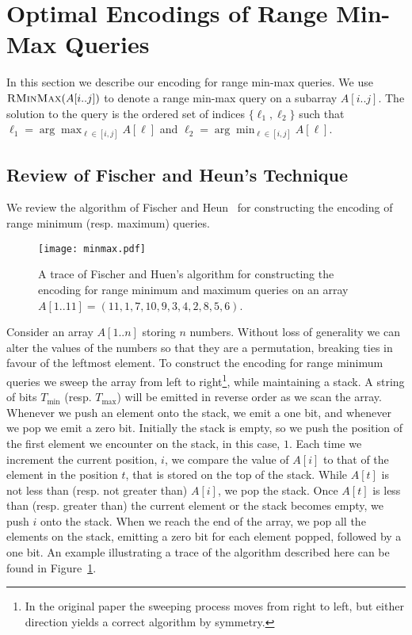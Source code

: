 \documentclass[runningheads]{llncs}
\newcommand{\rminmax}{\textsc{RMinMax}}
\begin{document}
\section{Optimal Encodings of Range Min-Max Queries\label{sec:min-max}}

In this section we describe our encoding for range min-max queries.
We use $\rminmax(A[i..j])$ to denote a range min-max query on a
subarray $A[i..j]$.  The solution to the query is the ordered set of
indices $\{\ell_1, \ell_2\}$ such that $\ell_1 = \arg\max_{\ell \in
  [i,j]}A[\ell]$ and $\ell_2 = \arg\min_{\ell \in [i,j]}A[\ell]$.

\subsection{Review of Fischer and Heun's Technique}

We review the algorithm of Fischer and Heun~\cite{FH11} for
constructing the encoding of range minimum (resp. maximum) queries.


\begin{figure}
\centering
\texttt{[image: minmax.pdf]}
\caption{\label{fig:perm}A trace of Fischer and Huen's algorithm for
  constructing the encoding for range minimum and maximum queries on
  an array $A[1..11]=(11,1,7,10,9,3,4,2,8,5,6)$.}
\end{figure}


Consider an array $A[1..n]$ storing $n$ numbers. Without loss of
generality we can alter the values of the numbers so that they are a
permutation, breaking ties in favour of the leftmost element. To
construct the encoding for range minimum queries we sweep the array
from left to right\footnote{In the original paper the sweeping process
  moves from right to left, but either direction yields a correct
  algorithm by symmetry.}, while maintaining a stack. A string of bits
$T_{\min}$ (resp. $T_{\max}$) will be emitted in reverse order as we
scan the array.  Whenever we push an element onto the stack, we emit a
one bit, and whenever we pop we emit a zero bit. Initially the stack
is empty, so we push the position of the first element we encounter on
the stack, in this case, $1$.  Each time we increment the current
position, $i$, we compare the value of $A[i]$ to that of the element
in the position $t$, that is stored on the top of the stack.  While
$A[t]$ is not less than (resp. not greater than) $A[i]$, we pop the
stack.  Once $A[t]$ is less than (resp. greater than) the current
element or the stack becomes empty, we push $i$ onto the stack.  When
we reach the end of the array, we pop all the elements on the stack,
emitting a zero bit for each element popped, followed by a one bit.
An example illustrating a trace of the algorithm described here can be
found in Figure~\ref{fig:perm}.
\end{document}
